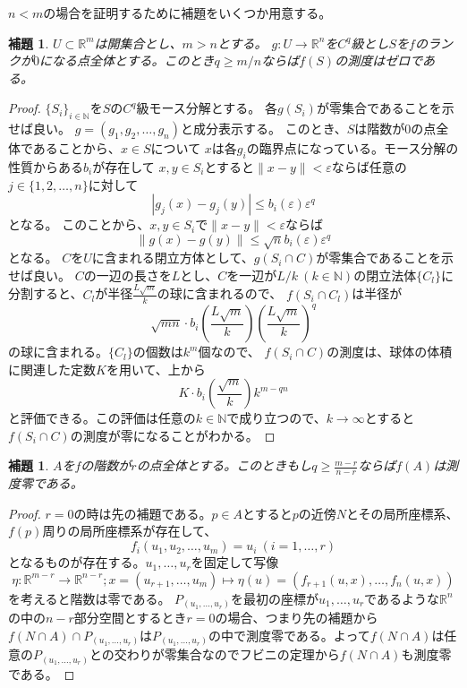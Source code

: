 \documentclass[leqno]{jsarticle}
\newtheorem{lem}[thm]{補題}
\newcommand{\nn}{\mathbb{N}}
\newcommand{\rr}{\mathbb{R}}
\newcommand{\ep}{\varepsilon}
\begin{document}
$n<m$の場合を証明するために補題をいくつか用意する。
\begin{lem}
$U\subset \rr^m$は開集合とし、$m>n$とする。
$g:U\to \rr^n$を$C^q$級とし$S$を$f$のランクが$0$になる点全体とする。このとき$q\ge m/n$ならば$f(S)$の測度はゼロである。
\end{lem}
\begin{proof}
$\{S_i\}_{i\in \nn}$を$S$の$C^q$級モース分解とする。
各$g(S_i)$が零集合であることを示せば良い。
$g=(g_1,g_2,\dots, g_n)$と成分表示する。
このとき、$S$は階数が$0$の点全体であることから、$x\in S$について
$x$は各$g_i$の臨界点になっている。モース分解の性質からある$b_i$が存在して
$x,y\in S_i$とすると$\|x-y\|<\ep$ならば任意の$j\in \{1,2,\dots, n\}$に対して
\[
|g_j(x)-g_j(y)|\le b_{i}(\ep)\ep^q
\]
となる。
このことから、$x,y\in S_i$で$\|x-y\|<\ep$ならば
\[
\|g(x)-g(y)\|\le \sqrt{n}b_i(\ep)\ep^q
\]
となる。
$C$を$U$に含まれる閉立方体として、$g(S_i\cap C)$が零集合であることを示せば良い。
$C$の一辺の長さを$L$とし、$C$を一辺が$L/k\ (k\in \nn)$の閉立法体$\{C_l\}$に分割すると、$C_l$が半径$\frac{L\sqrt{m}}{k}$の球に含まれるので、
$f(S_i\cap C_l)$は半径が
\[
\sqrt{mn}\cdot b_i\left(\frac{L\sqrt{m}}{k}\right)\left(\frac{L\sqrt{m}}{k}\right)^q
\]
の球に含まれる。$\{C_l\}$の個数は$k^m$個なので、
$f(S_i\cap C)$の測度は、球体の体積に関連した定数$K$を用いて、上から
\[
K\cdot b_i\left(\frac{\sqrt{m}}{k}\right)k^{m-qn}
\]
と評価できる。この評価は任意の$k\in \nn$で成り立つので、$k\to \infty$とすると$f(S_i\cap C)$の測度が零になることがわかる。
\end{proof}

\begin{lem}
$A$を$f$の階数が$r$の点全体とする。このときもし$q\ge \frac{m-r}{n-r}$ならば$f(A)$は測度零である。
\end{lem}
\begin{proof}
$r=0$の時は先の補題である。$p\in A$とすると$p$の近傍$N$とその局所座標系、$f(p)$周りの局所座標系が存在して、
\[
f_i(u_1,u_2,\dots, u_m)=u_i\ (i=1,\dots, r)
\]
となるものが存在する。$u_1,\dots,u_r$を固定して写像
\[
\eta:\rr^{m-r}\to \rr^{n-r}; x=(u_{r+1}, \dots, u_{m})\mapsto \eta(u)=(f_{r+1}(u,x), \dots, f_{n}(u,x))
\]
を考えると階数は零である。
$P_{(u_1,\dots,u_r)}$を最初の座標が$u_1,\dots,u_r$であるような$\rr^n$の中の$n-r$部分空間とするとき$r=0$の場合、つまり先の補題から$f(N\cap A)\cap P_{(u_1,\dots,u_r)}$は$P_{(u_1,\dots,u_r)}$の中で測度零である。よって$f( N\cap A)$は任意の$P_{(u_1,\dots,u_r)}$との交わりが零集合なのでフビニの定理から$f(N\cap A)$も測度零である。
\end{proof}
\end{document}

